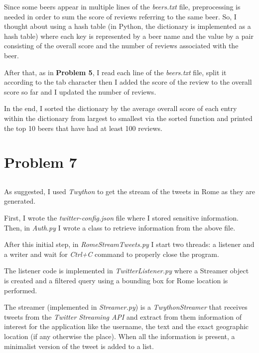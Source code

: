 \documentclass[11pt]{article}
\begin{document}
\bigskip
Since some beers appear in multiple lines of the \textit{beers.txt} file, preprocessing is needed in order to sum the score of reviews
referring to the same beer.
So, I thought about using a hash table (in Python, the dictionary is implemented as a hash table)
where each key is represented by a beer name and the value by a pair consisting of the overall score and the number of reviews associated with the beer.

\bigskip
After that, as in \textbf{Problem 5}, I read each line of the \textit{beers.txt} file, split it according to the tab character
then I added the score of the review to the overall score so far and I updated the number of reviews.

\bigskip
In the end, I sorted the dictionary by the average overall score of each entry within the dictionary from largest to smallest via the sorted function
and printed the top 10 beers that have had at least 100 reviews.


\newpage
\section{Problem 7}
\subsection{}
As suggested, I used \textit{Twython} to get the stream of the tweets in Rome as they are generated.

\bigskip
First, I wrote the \textit{twitter-config.json} file where I stored sensitive information. \newline
Then, in \textit{Auth.py} I wrote a class to retrieve information from the above file.

\bigskip
After this initial step, in \textit{RomeStreamTweets.py} I start two threads: a listener and a writer and wait for \textit{Ctrl+C} command to properly close
the program.

\bigskip
The listener code is implemented in \textit{TwitterListener.py} where a Streamer object is created and a filtered query using a bounding
box for Rome location is performed.

\bigskip
The streamer (implemented in \textit{Streamer.py}) is a \textit{TwythonStreamer} that receives tweets from the \textit{Twitter Streaming API} and extract from them information of interest
for the application like the username, the text and the exact geographic location (if any otherwise the place).
When all the information is present, a minimalist version of the tweet is added to a list.
\end{document}

